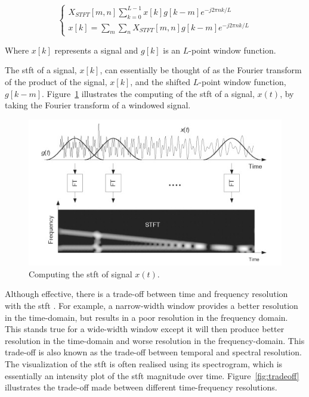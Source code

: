 \documentclass[class=report,11pt,crop=false]{standalone}
\begin{document}
\begin{equation}
    \begin{cases}
        X_{STFT}[m,n]\sum_{k=0}^{L-1}x[k]g[k-m]e^{-j2\pi nk/L}\\
        x[k] = \sum_{m}^{}\sum_{n}^{}X_{STFT}[m,n]g[k-m]e^{-j2\pi nk/L}
    \end{cases}
    \label{eqn:stft-pair}
\end{equation}

Where $x[k]$ represents a signal and $g[k]$ is an $L$-point window function. 

The \gls{stft} of a signal, $x[k]$, can essentially be thought of as the Fourier transform of the product of the signal, $x[k]$, and the shifted $L$-point window function, $g[k-m]$. Figure~\ref{fig:computing-stft} illustrates the computing of the \gls{stft} of a signal, $x(t)$, by taking the Fourier transform of a windowed signal.

\begin{figure}[htbp]
    \centering
    \includegraphics[width=0.6\columnwidth]{../Images/computing_stft.png}
    \caption{Computing the \gls{stft} of signal $x(t)$. \cite{nasser}}
    \label{fig:computing-stft}
\end{figure}

Although effective, there is a trade-off between time and frequency resolution with the \gls{stft} \cite{nasser, smith, pomr}. For example, a narrow-width window provides a better resolution in the time-domain, but results in a poor resolution in the frequency domain. This stands true for a wide-width window except it will then produce better resolution in the time-domain and worse resolution in the frequency-domain. This trade-off is also known as the trade-off between temporal and spectral resolution. The visualization of the \gls{stft} is often realised using its spectrogram, which is essentially an intensity plot of the \gls{stft} magnitude over time. Figure~\ref{fig:tradeoff} illustrates the trade-off made between different time-frequency resolutions.
\end{document}
